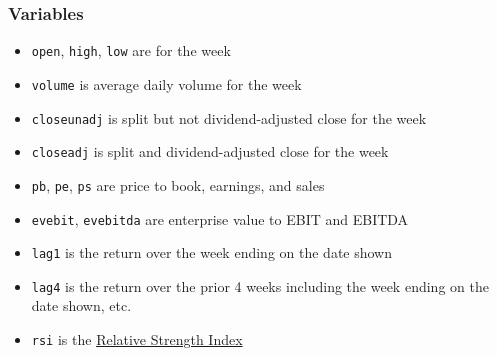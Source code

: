 \documentclass[10pt]{beamer}
\begin{document}
\begin{frame}[fragile]\frametitle{Variables}
\begin{itemize}
        \item \verb!open!, \verb!high!, \verb!low! are for the week
        \item \verb!volume! is average daily volume for the week
        \item \verb!closeunadj! is split but not dividend-adjusted close for the week
        \item \verb!closeadj! is split and dividend-adjusted close for the week
        \item \verb!pb!, \verb!pe!, \verb!ps! are price to book, earnings, and sales
        \item \verb!evebit!, \verb!evebitda! are enterprise value to EBIT and EBITDA
        \item \verb!lag1! is the return over the week ending on the date shown
        \item \verb!lag4! is the return over the prior 4 weeks including the week ending on the date shown, etc.
        \item \verb!rsi! is the \href{https://en.wikipedia.org/wiki/Relative_strength_index}{Relative Strength Index}
\end{itemize}
\end{frame}
\end{document}
